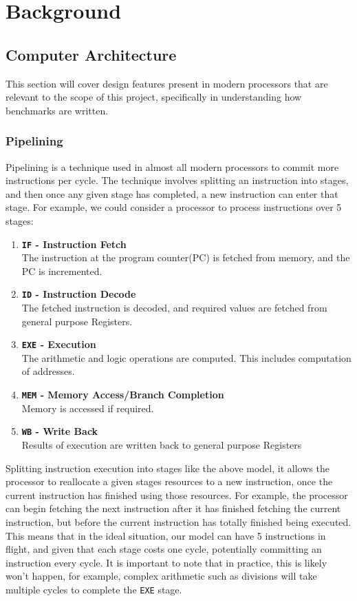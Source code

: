 \documentclass[bsc,frontabs,twoside,singlespacing,parskip,deptreport]{infthesis}     %
\begin{document}
\chapter{Background}\label{chap:bground}
\section{Computer Architecture}
This section will cover design features present in modern processors that are relevant to the scope of this project, specifically in understanding how benchmarks are written.

\subsection{Pipelining}
Pipelining is a technique used in almost all modern processors to commit more instructions per cycle. The technique involves splitting an instruction into stages, and then once any given stage has completed, a new instruction can enter that stage. For example, we could consider a processor to process instructions over 5 stages:
\begin{enumerate}
    \item{{\bf \texttt{IF} - Instruction Fetch} \\ The instruction at the program counter(PC) is fetched from memory, and the PC is incremented.}
    \item{{\bf \texttt{ID} - Instruction Decode} \\ The fetched instruction is decoded, and required values are fetched from general purpose Registers.}
    \item{{\bf \texttt{EXE} - Execution} \\ The arithmetic and logic operations are computed. This includes computation of addresses. }
    \item{{\bf \texttt{MEM} - Memory Access/Branch Completion} \\ Memory is accessed if required.}
    \item{{\bf \texttt{WB} - Write Back} \\ Results of execution are written back to general purpose Registers}
\end{enumerate}
Splitting instruction execution into stages like the above model, it allows the processor to reallocate a given stages resources to a new instruction, once the current instruction has finished using those resources. For example, the processor can begin fetching the next instruction after it has finished fetching the current instruction, but before the current instruction has totally finished being executed. This means that in the ideal situation, our model can have 5 instructions in flight, and given that each stage costs one cycle, potentially committing an instruction every cycle. It is important to note that in practice, this is likely won't happen, for example, complex arithmetic such as divisions will take multiple cycles to complete the \texttt{EXE} stage.
\end{document}
